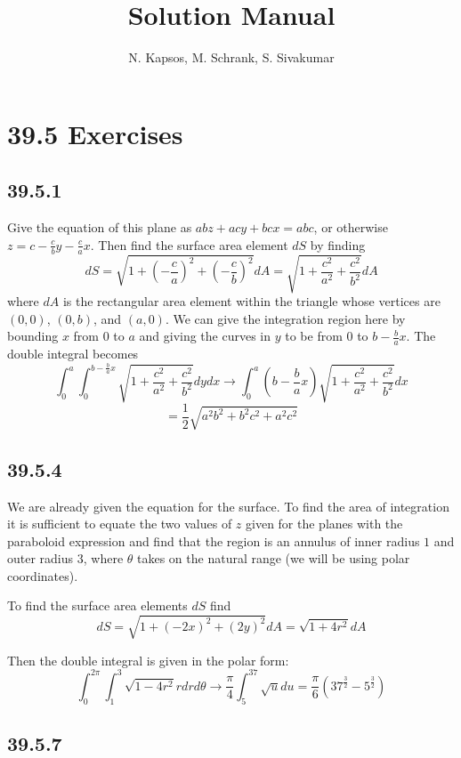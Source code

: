 \documentclass{article}
\title{Solution Manual}
\author{N. Kapsos, M. Schrank, S. Sivakumar}
\date{}
\begin{document}
\maketitle
\setcounter{secnumdepth}{0}

\section{39.5 Exercises}

\subsection{39.5.1}

Give the equation of this plane as $abz+acy+bcx=abc$, or otherwise $z=c-\frac{c}{b}y-\frac{c}{a}x$. Then find the surface area element $dS$ by finding $$dS = \sqrt{1+\left(-\frac{c}{a}\right)^2+\left(-\frac{c}{b}\right)^2}dA = \sqrt{1+\frac{c^2}{a^2}+\frac{c^2}{b^2}}dA$$
where $dA$ is the rectangular area element within the triangle whose vertices are $(0,0)$, $(0,b)$, and $(a,0)$. We can give the integration region here by bounding $x$ from $0$ to $a$ and giving the curves in $y$ to be from $0$ to $b-\frac{b}{a}x$. The double integral becomes $$\int_0^a\int_0^{b-\frac{b}{a}x}\sqrt{1+\frac{c^2}{a^2}+\frac{c^2}{b^2}} dydx \to \int_0^a (b-\frac{b}{a}x)\sqrt{1+\frac{c^2}{a^2}+\frac{c^2}{b^2}}dx$$
$$ = \frac{1}{2}\sqrt{a^2b^2+b^2c^2+a^2c^2}$$

\subsection{39.5.4}

We are already given the equation for the surface. To find the area of integration it is sufficient to equate the two values of $z$ given for the planes with the paraboloid expression and find that the region is an annulus of inner radius $1$ and outer radius $3$, where $\theta$ takes on the natural range (we will be using polar coordinates).

To find the surface area elements $dS$ find $$dS = \sqrt{1+(-2x)^2+(2y)^2}dA = \sqrt{1+4r^2}dA$$

Then the double integral is given in the polar form:
$$\int_0^{2\pi}\int_1^3 \sqrt{1-4r^2}rdrd\theta \to \frac{\pi}{4}\int_5^{37} \sqrt{u}du = \frac{\pi}{6}\left(37^{\frac{3}{2}}-5^{\frac{3}{2}}\right)$$

\subsection{39.5.7}
\end{document}

